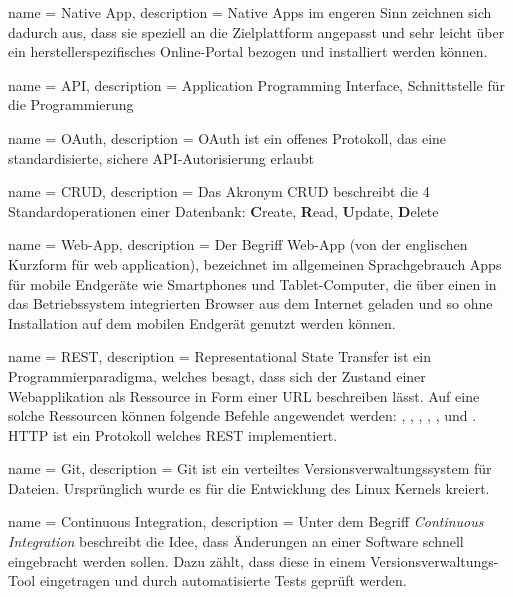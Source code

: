 {
	name = Native App,
	description = {Native Apps im engeren Sinn zeichnen sich dadurch aus, dass sie speziell an die Zielplattform angepasst und sehr leicht über ein herstellerspezifisches Online-Portal bezogen und installiert werden können.\cite{mobileapp}}
}

 {
	name = API,
	description = {Application Programming Interface, Schnittstelle für die Programmierung\cite{ba-kort-2012}}
}

 {
	name = OAuth,
	description = {OAuth ist ein offenes Protokoll, das eine standardisierte, sichere API-Autorisierung erlaubt\cite{oauth}}
}

 {
	name = CRUD,
	description = {Das Akronym CRUD beschreibt die 4 Standardoperationen einer Datenbank: \textbf{C}reate, \textbf{R}ead, \textbf{U}pdate, \textbf{D}elete\cite{crud}}
}

 {
	name = Web-App,
	description = {Der Begriff Web-App (von der englischen Kurzform für web application), bezeichnet im allgemeinen Sprachgebrauch Apps für mobile Endgeräte wie Smartphones und Tablet-Computer, die über einen in das Betriebssystem integrierten Browser aus dem Internet geladen und so ohne Installation auf dem mobilen Endgerät genutzt werden können.\cite{webapp}}
}

 {
	name = REST,
	description = {Representational State Transfer\cite{rest} ist ein Programmierparadigma, welches besagt, dass sich der Zustand einer Webapplikation als Ressource in Form einer URL beschreiben lässt. Auf eine solche Ressourcen können folgende Befehle angewendet werden: , , , , ,  und .
	HTTP ist ein Protokoll welches REST implementiert.\cite{ba-kort-2012}}
}

 {
	name = Git,
	description = {Git ist ein verteiltes Versionsverwaltungssystem für Dateien. Ursprünglich wurde es für die Entwicklung des Linux Kernels kreiert.\cite{ba-kort-2012}}
}

 {
	name = Continuous Integration,
	description = {Unter dem Begriff \emph{Continuous Integration}\cite{cont-integration} beschreibt die Idee, dass Änderungen an einer Software schnell eingebracht werden sollen. Dazu zählt, dass diese in einem Versionsverwaltungs-Tool eingetragen und durch automatisierte Tests geprüft werden.\cite{ba-kort-2012}}
}

